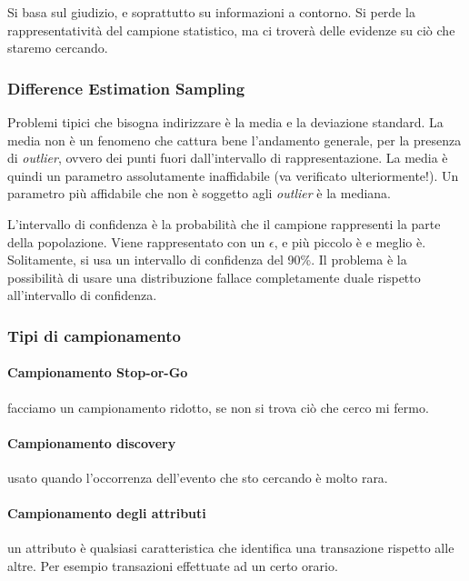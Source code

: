 

Si basa sul giudizio, e soprattutto su informazioni a contorno. Si perde la rappresentatività del campione statistico, ma ci troverà delle evidenze su ciò che staremo cercando.

\subsubsection{Difference Estimation Sampling}

Problemi tipici che bisogna indirizzare è la media e la deviazione standard.
La media non è un fenomeno che cattura bene l'andamento generale, per la presenza di \textit{outlier}, ovvero dei punti fuori dall'intervallo di rappresentazione. %
La media è quindi un parametro assolutamente inaffidabile (va verificato ulteriormente!). Un parametro più affidabile che non è soggetto agli \textit{outlier} è la mediana.

L'intervallo di confidenza è la probabilità che il campione rappresenti la parte della popolazione. Viene rappresentato con un $\epsilon$, e più piccolo è e meglio è. Solitamente, si usa un intervallo di confidenza del 90\%. Il problema è la possibilità di usare una distribuzione fallace completamente duale rispetto all'intervallo di confidenza.


\subsubsection{Tipi di campionamento}

\paragraph*{Campionamento Stop-or-Go} facciamo un campionamento ridotto, se non si trova ciò che cerco mi fermo.

\paragraph*{Campionamento discovery} usato quando l'occorrenza dell'evento che sto cercando è molto rara.

\paragraph*{Campionamento degli attributi} un attributo è qualsiasi caratteristica che identifica una transazione rispetto alle altre. Per esempio transazioni effettuate ad un certo orario.


